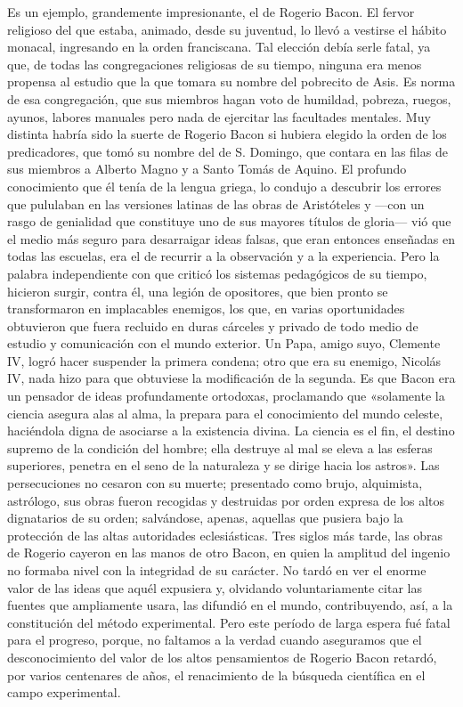 \documentclass[a4paper, 12pt, draft]{article}
\begin{document}
{Es un ejemplo, grandemente impresionante, el de  Rogerio Bacon. El fervor religioso del que estaba, animado, desde su juventud, lo llevó a vestirse el hábito monacal, ingresando en la orden franciscana. Tal elección debía serle fatal, ya que, de todas las congregaciones religiosas de su tiempo, ninguna era menos propensa al estudio que la que tomara su nombre del pobrecito de Asis. Es norma de esa congregación, que sus miembros hagan voto de humildad, pobreza, ruegos, ayunos, labores manuales pero nada de ejercitar las facultades mentales. Muy distinta habría sido la suerte de Rogerio Bacon si hubiera elegido la orden de los predicadores, que tomó su nombre del de S. Domingo, que contara en las filas de sus miembros a Alberto Magno y a Santo Tomás de Aquino. El profundo conocimiento que él tenía de la lengua griega, lo condujo a descubrir los errores que pululaban en las versiones latinas de las obras de Aristóteles y ---con un rasgo de genialidad que constituye uno de sus mayores títulos de gloria--- vió que el medio más seguro para desarraigar ideas falsas, que eran entonces enseñadas en todas las escuelas, era el de recurrir a la observación y a la experiencia. Pero la palabra independiente con que criticó los sistemas pedagógicos de su tiempo, hicieron surgir, contra él, una legión de opositores, que bien pronto se transformaron en implacables enemigos, los que, en varias oportunidades obtuvieron que fuera recluido en duras cárceles y privado de todo medio de estudio y comunicación con el mundo exterior. Un Papa, amigo suyo, Clemente IV, logró hacer suspender la primera condena; otro que era su enemigo, Nicolás IV, nada hizo para que obtuviese la modificación de la segunda. Es que Bacon era un pensador de ideas profundamente ortodoxas, proclamando que «solamente la ciencia asegura alas al alma, la prepara para el conocimiento del mundo celeste, haciéndola digna de asociarse a la existencia divina. La ciencia es el fin, el destino supremo de la condición del hombre; ella destruye al mal se eleva a las esferas superiores, penetra en el seno de la naturaleza y se dirige hacia los astros». Las persecuciones no cesaron con su muerte; presentado como brujo, alquimista, astrólogo, sus obras fueron recogidas y destruidas por orden expresa de los altos dignatarios de su orden; salvándose, apenas, aquellas que pusiera bajo la protección de las altas autoridades eclesiásticas. Tres siglos más tarde, las obras de Rogerio cayeron en las manos de otro Bacon, en quien la amplitud del ingenio no formaba nivel con la integridad de su carácter. No tardó en ver el enorme valor de las ideas que aquél expusiera y, olvidando voluntariamente citar las fuentes que ampliamente usara, las difundió en el mundo, contribuyendo, así, a la constitución del método experimental. Pero este período de larga espera fué fatal para el progreso, porque, no faltamos a la verdad cuando aseguramos que el desconocimiento del valor de los altos pensamientos de Rogerio Bacon retardó, por varios centenares de años, el renacimiento de la búsqueda científica en el campo experimental.


}
\end{document}
